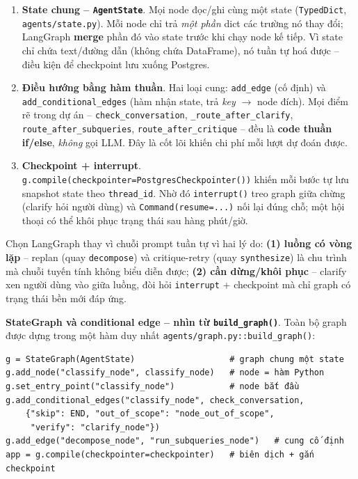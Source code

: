\documentclass[12pt, a4paper]{report}
\begin{document}
\begin{enumerate}
  \item \textbf{State chung -- \texttt{AgentState}}. Mọi node đọc/ghi cùng một state (\texttt{TypedDict}, \texttt{agents/state.py}). Mỗi node chỉ trả \emph{một phần} dict các trường nó thay đổi; LangGraph \textbf{merge} phần đó vào state trước khi chạy node kế tiếp. Vì state chỉ chứa text/đường dẫn (không chứa DataFrame), nó tuần tự hoá được -- điều kiện để checkpoint lưu xuống Postgres.
  \item \textbf{Điều hướng bằng hàm thuần}. Hai loại cung: \texttt{add\_edge} (cố định) và \texttt{add\_conditional\_edges} (hàm nhận state, trả \emph{key} $\rightarrow$ node đích). Mọi điểm rẽ trong dự án -- \texttt{check\_conversation}, \texttt{\_route\_after\_clarify}, \texttt{route\_after\_subqueries}, \texttt{route\_after\_critique} -- đều là \textbf{code thuần if/else}, \emph{không} gọi LLM. Đây là cốt lõi khiến chi phí mỗi lượt dự đoán được.
  \item \textbf{Checkpoint + interrupt}. \texttt{g.compile(checkpointer=PostgresCheckpointer())} khiến mỗi bước tự lưu snapshot state theo \texttt{thread\_id}. Nhờ đó \texttt{interrupt()} treo graph giữa chừng (clarify hỏi người dùng) và \texttt{Command(resume=...)} nối lại đúng chỗ; một hội thoại có thể khôi phục trạng thái sau hàng phút/giờ.
\end{enumerate}

Chọn LangGraph thay vì chuỗi prompt tuần tự vì hai lý do: \textbf{(1) luồng có vòng lặp} -- replan (quay \texttt{decompose}) và critique-retry (quay \texttt{synthesize}) là chu trình mà chuỗi tuyến tính không biểu diễn được; \textbf{(2) cần dừng/khôi phục} -- clarify xen người dùng vào giữa luồng, đòi hỏi \texttt{interrupt} + checkpoint mà chỉ graph có trạng thái bền mới đáp ứng.

\medskip\noindent\textbf{StateGraph và conditional edge -- nhìn từ \texttt{build\_graph()}}. Toàn bộ graph được dựng trong một hàm duy nhất \texttt{agents/graph.py::build\_graph()}:

{\small
\begin{verbatim}
g = StateGraph(AgentState)                   # graph chung một state
g.add_node("classify_node", classify_node)   # node = hàm Python
g.set_entry_point("classify_node")           # node bắt đầu
g.add_conditional_edges("classify_node", check_conversation,
    {"skip": END, "out_of_scope": "node_out_of_scope",
     "verify": "clarify_node"})
g.add_edge("decompose_node", "run_subqueries_node")   # cung cố định
app = g.compile(checkpointer=checkpointer)   # biên dịch + gắn checkpoint
\end{verbatim}
}
\end{document}
